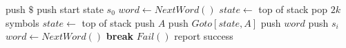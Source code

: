 \documentclass[varwidth=\maxdimen]{standalone}
\begin{document}
\begin{algorithmic}[1] %
  \State push $\$$
  \State push start state $s_0$
  \State $word \gets NextWord()$
  \LoopForever
    \State $state \gets $ top of stack
      \State pop $2k$ symbols
      \State $state \gets $ top of stack
      \State push $A$
      \State push $Goto[state,A]$
      \State push $word$
      \State push $s_i$
      \State $word \gets NextWord()$
      \State \textbf{break}
    \Else
      \State $Fail()$
    \EndIf
  \EndLoopForever
  \State report success
\end{algorithmic}
\end{document}

